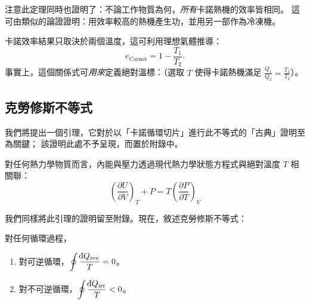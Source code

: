 注意此定理同時也證明了：不論工作物質為何，\emph{所有}卡諾熱機的效率皆相同。
這可由類似的論證證明：用效率較高的熱機產生功，並用另一部作為冷凍機。

卡諾效率結果只取決於兩個溫度，這可利用理想氣體推導：
\[
    e_{\text{Carnot}} = 1 - \frac{T_1}{T_2}.
\]
事實上，這個關係式可\emph{用來}定義絕對溫標：（選取 $T$ 使得卡諾熱機滿足 $\frac{Q_1}{Q_2} = \frac{T_1}{T_2}$）。

\subsection{克勞修斯不等式}
我們將提出一個引理，它對於以「卡諾循環切片」進行此不等式的「古典」證明至為關鍵；
該證明此處不予呈現，而置於附錄中。
\begin{lemma}
對任何熱力學物質而言，內能與壓力透過現代熱力學狀態方程式與絕對溫度 $T$ 相關聯：
\[
\left(\frac{\partial U}{\partial V}\right)_T + P = T\left(\frac{\partial P}{\partial T}\right)_V
\]
\end{lemma}

我們同樣將此引理的證明留至附錄。現在，敘述克勞修斯不等式：

\begin{theorem}
    對任何循環過程，
    \begin{enumerate}
        \item 對可逆循環，$\displaystyle \oint \frac{\dbar Q_{\text{rev}}}{T} = 0$。
        \item 對不可逆循環，$\displaystyle \oint \frac{\dbar Q_{\text{irr}}}{T} < 0$。
    \end{enumerate}
\end{theorem}


